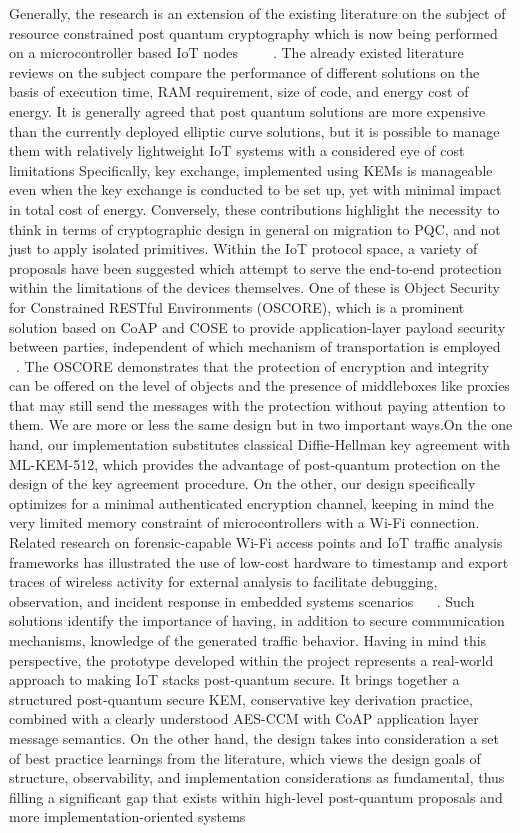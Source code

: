 \documentclass[USenglish,oneside,twocolumn]{article}
\begin{document}
    Generally, the research is an extension of the existing literature on the subject of resource constrained post quantum cryptography which is now being performed on a microcontroller based IoT nodes ~\cite{Tao2024} ~\cite{asif2021} ~\cite{al2025}. The already existed literature reviews on the subject compare the performance of different solutions on the basis of execution time, RAM requirement, size of code, and energy cost of energy. It is generally agreed that post quantum solutions are more expensive than the currently deployed elliptic curve solutions, but it is possible to manage them with relatively lightweight IoT systems with a considered eye of cost limitations Specifically, key exchange, implemented using KEMs is manageable even when the key exchange is conducted to be set up, yet with minimal impact in total cost of energy. Conversely, these contributions highlight the necessity to think in terms of cryptographic design in general on migration to PQC, and not just to apply isolated primitives. Within the IoT protocol space, a variety of proposals have been suggested which attempt to serve the end-to-end protection within the limitations of the devices themselves. One of these is Object Security for Constrained RESTful Environments (OSCORE), which is a prominent solution based on CoAP and COSE to provide application-layer payload security between parties, independent of which mechanism of transportation is employed ~\cite{sel2019}. The OSCORE demonstrates that the protection of encryption and integrity can be offered on the level of objects and the presence of middleboxes like proxies that may still send the messages with the protection without paying attention to them. We are more or less the same design but in two important ways.On the one hand, our implementation substitutes classical Diffie-Hellman key agreement with ML-KEM-512, which provides the advantage of post-quantum protection on the design of the key agreement procedure. On the other, our design specifically optimizes for a minimal authenticated encryption channel, keeping in mind the very limited memory constraint of microcontrollers with a Wi-Fi connection. Related research on forensic-capable Wi-Fi access points and IoT traffic analysis frameworks has illustrated the use of low-cost hardware to timestamp and export traces of wireless activity for external analysis to facilitate debugging, observation, and incident response in embedded systems scenarios ~\cite{fabio2023} ~\cite{tina2021}. Such solutions identify the importance of having, in addition to secure communication mechanisms, knowledge of the generated traffic behavior. Having in mind this perspective, the prototype developed within the project represents a real-world approach to making IoT stacks post-quantum secure. It brings together a structured post-quantum secure KEM, conservative key derivation practice, combined with a clearly understood AES-CCM with CoAP application layer message semantics. On the other hand, the design takes into consideration a set of best practice learnings from the literature, which views the design goals of structure, observability, and implementation considerations as fundamental, thus filling a significant gap that exists within high-level post-quantum proposals and more implementation-oriented systems 
\end{document}
